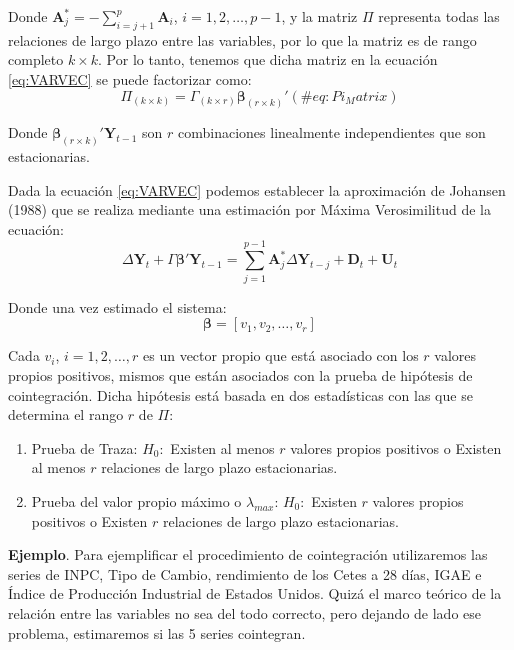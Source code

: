 \documentclass[
]{book}
\begin{document}
Donde \(\mathbf{A}_j^* = - \sum_{i=j+1}^p \mathbf{A}_i\), \(i = 1, 2, \ldots, p-1\), y la matriz \(\Pi\) representa todas las relaciones de largo plazo entre las variables, por lo que la matriz es de rango completo \(k \times k\). Por lo tanto, tenemos que dicha matriz en la ecuación \eqref{eq:VARVEC} se puede factorizar como:
\begin{equation}
    \Pi_{(k \times k)} = \Gamma_{(k \times r)} \boldsymbol{\beta}_{(r \times k)}'
    (\#eq:Pi_Matrix)
\end{equation}

Donde \(\boldsymbol{\beta}_{(r \times k)}' \mathbf{Y}_{t-1}\) son \(r\) combinaciones linealmente independientes que son estacionarias.

Dada la ecuación \eqref{eq:VARVEC} podemos establecer la aproximación de Johansen (1988) que se realiza mediante una estimación por Máxima Verosimilitud de la ecuación:
\begin{equation}
    \Delta \mathbf{Y}_t + \Gamma \boldsymbol{\beta}' \mathbf{Y}_{t-1} = \sum_{j=1}^{p-1} \mathbf{A}^*_j \Delta \mathbf{Y}_{t-j} + \mathbf{D}_t + \mathbf{U}_t
\end{equation}

Donde una vez estimado el sistema:
\begin{equation}
    \boldsymbol{\beta} = [v_1, v_2, \ldots, v_r]
\end{equation}

Cada \(v_i\), \(i = 1, 2, \ldots, r\) es un vector propio que está asociado con los \(r\) valores propios positivos, mismos que están asociados con la prueba de hipótesis de cointegración. Dicha hipótesis está basada en dos estadísticas con las que se determina el rango \(r\) de \(\Pi\):

\begin{enumerate}
\def\labelenumi{\arabic{enumi}.}
\item
  Prueba de Traza:
  \(H_0 :\) Existen al menos \(r\) valores propios positivos o Existen al menos \(r\) relaciones de largo plazo estacionarias.
\item
  Prueba del valor propio máximo o \(\lambda_{max}\):
  \(H_0 :\) Existen \(r\) valores propios positivos o Existen \(r\) relaciones de largo plazo estacionarias.
\end{enumerate}

\textbf{Ejemplo}. Para ejemplificar el procedimiento de cointegración utilizaremos las series de INPC, Tipo de Cambio, rendimiento de los Cetes a 28 días, IGAE e Índice de Producción Industrial de Estados Unidos. Quizá el marco teórico de la relación entre las variables no sea del todo correcto, pero dejando de lado ese problema, estimaremos si las 5 series cointegran.
\end{document}
